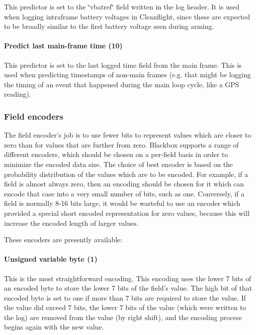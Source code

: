 This predictor is set to the \char`\"{}vbatref\char`\"{} field written in the log header. It is used when logging intraframe battery voltages in Cleanflight, since these are expected to be broadly similar to the first battery voltage seen during arming.

\paragraph*{Predict last main-\/frame time (10)}

This predictor is set to the last logged {\ttfamily time} field from the main frame. This is used when predicting timestamps of non-\/main frames (e.\+g. that might be logging the timing of an event that happened during the main loop cycle, like a G\+P\+S reading).

\subsubsection*{Field encoders}

The field encoder's job is to use fewer bits to represent values which are closer to zero than for values that are further from zero. Blackbox supports a range of different encoders, which should be chosen on a per-\/field basis in order to minimize the encoded data size. The choice of best encoder is based on the probability distribution of the values which are to be encoded. For example, if a field is almost always zero, then an encoding should be chosen for it which can encode that case into a very small number of bits, such as one. Conversely, if a field is normally 8-\/16 bits large, it would be wasteful to use an encoder which provided a special short encoded representation for zero values, because this will increase the encoded length of larger values.

These encoders are presently available\+:

\paragraph*{Unsigned variable byte (1)}

This is the most straightforward encoding. This encoding uses the lower 7 bits of an encoded byte to store the lower 7 bits of the field's value. The high bit of that encoded byte is set to one if more than 7 bits are required to store the value. If the value did exceed 7 bits, the lower 7 bits of the value (which were written to the log) are removed from the value (by right shift), and the encoding process begins again with the new value.

